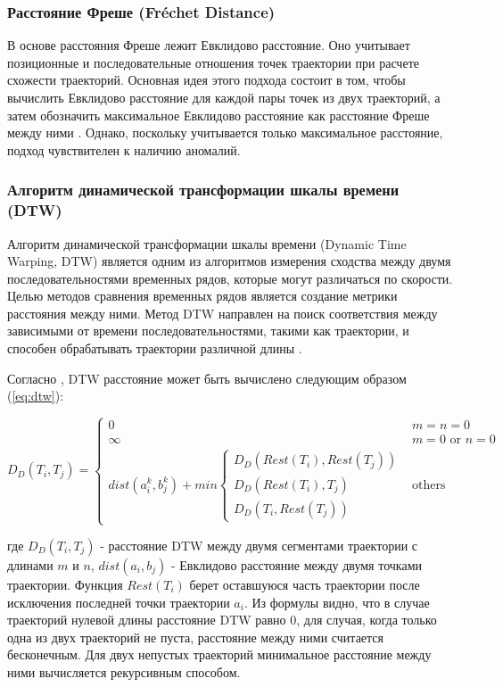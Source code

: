 \subsubsection{Расстояние Фреше (Fréchet Distance)}

В основе расстояния Фреше лежит Евклидово расстояние. Оно учитывает позиционные и последовательные отношения точек траектории при расчете схожести траекторий. Основная идея этого подхода состоит в том, чтобы вычислить Евклидово расстояние для каждой пары точек из двух траекторий, а затем обозначить максимальное Евклидово расстояние как расстояние Фреше между ними \cite{article:8_review_mot_cl_alg}\cite{inproceedings:29_fr_dist}. Однако, поскольку учитывается только максимальное расстояние, подход чувствителен к наличию аномалий.

\subsubsection{Алгоритм динамической трансформации шкалы времени (DTW)}

Алгоритм динамической трансформации шкалы времени (Dynamic Time Warping, DTW) является одним из алгоритмов измерения сходства между двумя последовательностями временных рядов, которые могут различаться по скорости. Целью методов сравнения временных рядов является создание метрики расстояния между ними. Метод DTW направлен на поиск соответствия между зависимыми от времени последовательностями, такими как траектории, и способен обрабатывать траектории различной длины \cite{article:8_review_mot_cl_alg}.

Согласно \cite{article:8_review_mot_cl_alg}, DTW расстояние может быть вычислено следующим образом (\ref{eq:dtw}):

\begin{equation} \label{eq:dtw}
	D_D(T_i, T_j) = 
		\begin{cases}
			0 				&\text{$m = n = 0$}\\
			\infty 			&\text{$m = 0$ or $n = 0$}\\
			dist(a_i^k, b_j^k) + min 
				\begin{cases}
					D_D(Rest(T_i), Rest(T_j))\\
					D_D(Rest(T_i), T_j)\\
					D_D(T_i, Rest(T_j))
				\end{cases} &\text{others}
		\end{cases}
\end{equation}

где $D_D(T_i, T_j)$ - расстояние DTW между двумя сегментами траектории с длинами $m$ и $n$, $dist(a_i, b_j)$ - Евклидово расстояние между двумя точками траектории. Функция $Rest(T_i)$ берет оставшуюся часть траектории после исключения последней точки траектории $a_i$. Из формулы видно, что в случае траекторий нулевой длины расстояние DTW равно 0, для случая, когда только одна из двух траекторий не пуста, расстояние между ними считается бесконечным. Для двух непустых траекторий минимальное расстояние между ними вычисляется рекурсивным способом.

